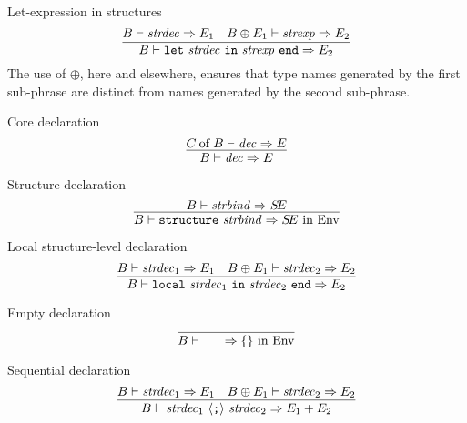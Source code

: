 \begin{inference-rule}{Let-expression in structures}
\begin{equation}\label{rule:static-modules:let-strexp}
  \vcenter{\infer{\B\ts\letstrexp\ra\E_{2}}
    {\B\ts\strdec\ra\E_{1}
      &\B\oplus\E_{1}\ts\strexp\ra\E_{2}}}
\end{equation}
The use of $\oplus$, here and elsewhere, ensures that type names
generated by the first sub-phrase are distinct from names generated by
the second sub-phrase.
\end{inference-rule}


\begin{inference-rule}{Core declaration}
\begin{equation}\label{rule:static-modules:core-declaration}
  \vcenter{\infer{\B\ts\dec\ra\E}
    {\of{\C}{\B}\ts\dec\ra\E}}
\end{equation}
\end{inference-rule}

\begin{inference-rule}{Structure declaration}
\begin{equation}\label{rule:static-modules:structure-declaration}
  \vcenter{\infer{\B\ts\singstrdec\ra\SE\ \In\ \Env}
    {\B\ts\strbind\ra\SE}}
\end{equation}
\end{inference-rule}

\begin{inference-rule}{Local structure-level declaration}
\begin{equation}\label{rule:static-modules:local-structure-level-declaration}
  \vcenter{\infer{\B\ts\localstrdec\ra\E_{2}}
    {\B\ts\strdec_{1}\ra\E_{1}
      & \B\oplus\E_{1}\ts\strdec_{2}\ra\E_{2}}}
\end{equation}
\end{inference-rule}

\begin{inference-rule}{Empty declaration}
\begin{equation}\label{rule:static-modules:empty-strdec-rule}
  \vcenter{\infer{\B\ts\emptystrdec\ra \emptymap{\rm\ in}\ \Env}
    {}}
\end{equation}
\end{inference-rule}

\begin{inference-rule}{Sequential declaration}
\begin{equation}\label{rule:static-modules:sequential-strdec-rule}
  \vcenter{\infer{\B\ts\seqstrdec\ra\plusmap{\E_{1}}{\E_{2}}}
    {\B\ts\strdec_{1}\ra\E_{1}
      & \B\oplus\E_{1}\ts\strdec_{2}\ra\E_{2}}}
\end{equation}
\end{inference-rule}


